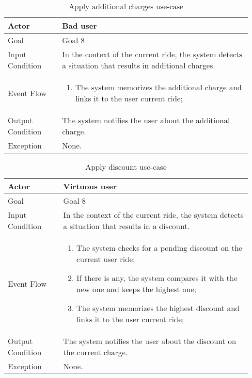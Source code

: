 \begin{table}[H]
\begin{center}
\begin{tabular}{p{} | p{}}
\hline
Actor & Bad user\\
\hline
Goal & Goal 8\\
\hline
Input Condition & In the context of the current ride, the system detects a situation that results in additional charges.\\
\hline
Event Flow & 
\begin{enumerate}
\item The system memorizes the additional charge and links it to the user current ride;
\end{enumerate} \\
\hline
Output Condition & The system notifies the user about the additional charge.\\
\hline
Exception & None.\\
\hline
\end{tabular}
\end{center}
\caption{Apply additional charges use-case}
\label{apply_additional_charges_uc}
\end{table}

\begin{table}[H]
\begin{center}
\begin{tabular}{p{} | p{}}
\hline
Actor & Virtuous user\\
\hline
Goal & Goal 8\\
\hline
Input Condition & In the context of the current ride, the system detects a situation that results in a discount.\\
\hline
Event Flow & 
\begin{enumerate}
\item The system checks for a pending discount on the current user ride;
\item If there is any, the system compares it with the new one and keeps the highest one;
\item The system memorizes the highest discount and links it to the user current ride;
\end{enumerate} \\
\hline
Output Condition & The system notifies the user about the discount on the current charge.\\
\hline
Exception & None.\\
\hline
\end{tabular}
\end{center}
\caption{Apply discount use-case}
\label{apply_discounts_uc}
\end{table}